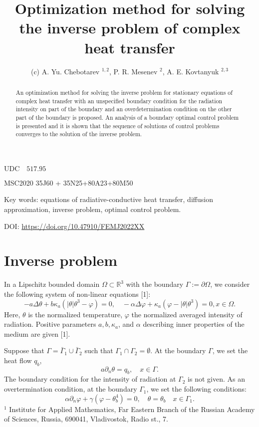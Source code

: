\documentclass[10pt]{article}
\title{Optimization method for solving the inverse problem of complex heat transfer }
\author{(c) A. Yu. Chebotarev ${ }^{1,2}$, P. R. Mesenev ${ }^{2}$, A. E. Kovtanyuk ${ }^{2,3}$}
\date{}
\begin{document}
\maketitle
$\mathrm{UDC} \quad 517.95$

MSC2020 35J60 + 35N25+80A23+80M50



\begin{abstract}
An optimization method for solving the inverse problem for stationary equations of complex heat transfer with an unspecified boundary condition for the radiation intensity on part of the boundary and an overdetermination condition on the other part of the boundary is proposed. An analysis of a boundary optimal control problem is presented and it is shown that the sequence of solutions of control problems converges to the solution of the inverse problem.
\end{abstract}

Key words: equations of radiative-conductive heat transfer, diffusion approximation, inverse problem, optimal control problem.

DOI: \href{https://doi.org/10.47910/FEMJ2022XX}{https://doi.org/10.47910/FEMJ2022XX}

\section{Inverse problem}
In a Lipschitz bounded domain $\Omega \subset \mathbb{R}^{3}$ with the boundary $\Gamma:=\partial \Omega$, we consider the following system of non-linear equations [1]:
$$
-a \Delta \theta+b \kappa_{a}\left(|\theta| \theta^{3}-\varphi\right)=0, \quad-\alpha \Delta \varphi+\kappa_{a}\left(\varphi-|\theta| \theta^{3}\right)=0, x \in \Omega .
$$
Here, $\theta$ is the normalized temperature, $\varphi$ the normalized averaged intensity of radiation. Positive parameters $a, b, \kappa_{a}$, and $\alpha$ describing inner properties of the medium are given [1].

Suppose that $\Gamma=\bar{\Gamma}_{1} \cup \bar{\Gamma}_{2}$ such that $\Gamma_{1} \cap \Gamma_{2}=\emptyset$. At the boundary $\Gamma$, we set the heat flow $q_{b}$,
$$
a \partial_{n} \theta=q_{b}, \quad x \in \Gamma .
$$
The boundary condition for the intensity of radiation at $\Gamma_{2}$ is not given. As an overtermination condition, at the boundary $\Gamma_{1}$, we set the following conditions:
$$
\alpha \partial_{n} \varphi+\gamma\left(\varphi-\theta_{b}^{4}\right)=0, \quad \theta=\theta_{b} \quad x \in \Gamma_{1} .
$$
${ }^{1}$ Institute for Applied Mathematics, Far Eastern Branch of the Russian Academy of Sciences, Russia, 690041, Vladivostok, Radio st., 7.
\end{document}

